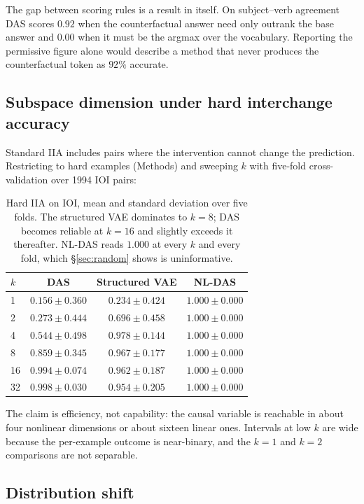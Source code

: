 \documentclass[11pt]{article}
\begin{document}
The gap between scoring rules is a result in itself. On subject--verb agreement
DAS scores $0.92$ when the counterfactual answer need only outrank the base
answer and $0.00$ when it must be the argmax over the vocabulary. Reporting the
permissive figure alone would describe a method that never produces the
counterfactual token as $92\%$ accurate.

\subsection{Subspace dimension under hard interchange accuracy}

Standard IIA includes pairs where the intervention cannot change the prediction.
Restricting to hard examples (Methods) and sweeping $k$ with five-fold
cross-validation over 1994 IOI pairs:

\begin{table}[t]
\centering\small
\begin{tabular}{lccc}
\toprule
$k$ & DAS & Structured VAE & NL-DAS \\
\midrule
1  & $0.156 \pm 0.360$ & $0.234 \pm 0.424$ & $1.000 \pm 0.000$ \\
2  & $0.273 \pm 0.444$ & $0.696 \pm 0.458$ & $1.000 \pm 0.000$ \\
4  & $0.544 \pm 0.498$ & $\mathbf{0.978 \pm 0.144}$ & $1.000 \pm 0.000$ \\
8  & $0.859 \pm 0.345$ & $0.967 \pm 0.177$ & $1.000 \pm 0.000$ \\
16 & $\mathbf{0.994 \pm 0.074}$ & $0.962 \pm 0.187$ & $1.000 \pm 0.000$ \\
32 & $0.998 \pm 0.030$ & $0.954 \pm 0.205$ & $1.000 \pm 0.000$ \\
\bottomrule
\end{tabular}
\caption{Hard IIA on IOI, mean and standard deviation over five folds. The
structured VAE dominates to $k = 8$; DAS becomes reliable at $k = 16$ and
slightly exceeds it thereafter. NL-DAS reads $1.000$ at every $k$ and every fold,
which \S\ref{sec:random} shows is uninformative.}
\end{table}

The claim is efficiency, not capability: the causal variable is reachable in
about four nonlinear dimensions or about sixteen linear ones. Intervals at low
$k$ are wide because the per-example outcome is near-binary, and the $k=1$ and
$k=2$ comparisons are not separable.

\subsection{Distribution shift}
\end{document}
